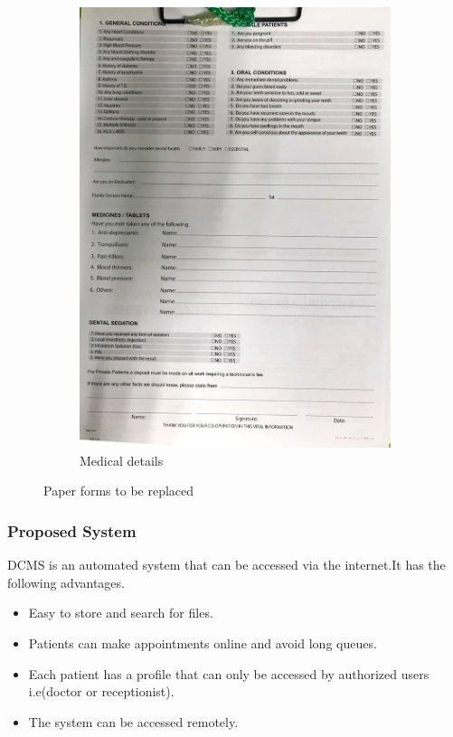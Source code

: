 \documentclass[11 pt]{article}
\begin{document}
\begin{figure}
\begin{subfigure}{.6\textwidth}
\includegraphics[width=.95\linewidth]{patient_paper_form_med.jpeg}
\caption{Medical details}
\label{fig:sub2}
\end{subfigure}
\caption{Paper forms to be replaced}
\label{fig:test}
\end{figure}

\subsubsection{Proposed System}
DCMS is an automated system that can be accessed via the internet.It has the following advantages.
\begin{itemize}
\item
Easy to store and search for files.
\item
Patients can make appointments online and avoid long queues.
\item
Each patient has a profile that can only be accessed by authorized users i.e(doctor or receptionist).
\item
The system can be accessed remotely.
\end{itemize}
\end{document}
